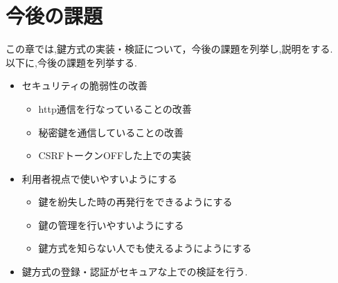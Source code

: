 \chapter{今後の課題}

この章では,鍵方式の実装・検証について，今後の課題を列挙し,説明をする.\\
以下に,今後の課題を列挙する.
\begin{itemize}
    \item セキュリティの脆弱性の改善
    \begin{itemize}
        \item http通信を行なっていることの改善
        \item 秘密鍵を通信していることの改善
        \item CSRFトークンOFF\cite{CSRF-token}した上での実装
    \end{itemize}
    \item 利用者視点で使いやすいようにする
        \begin{itemize} 
            \item 鍵を紛失した時の再発行をできるようにする
            \item 鍵の管理を行いやすいようにする
            \item 鍵方式を知らない人でも使えるようにようにする
    \end{itemize}
    \item 鍵方式の登録・認証がセキュアな上での検証を行う.

\end{itemize}

